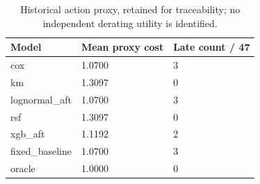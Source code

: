 \documentclass[10pt,a4paper]{article}
\begin{document}
\begin{table}[H]\centering\scriptsize
\caption{Historical action proxy, retained for traceability; no independent derating utility is identified.}\label{tab:S9}
\begin{tabular*}{\linewidth}{@{\extracolsep{\fill}}lll}\toprule
Model & Mean proxy cost & Late count / 47\\\midrule
cox & 1.0700 & 3\\
km & 1.3097 & 0\\
lognormal\_aft & 1.0700 & 3\\
rsf & 1.3097 & 0\\
xgb\_aft & 1.1192 & 2\\
fixed\_baseline & 1.0700 & 3\\
oracle & 1.0000 & 0\\
\bottomrule\end{tabular*}\end{table}
\end{document}
